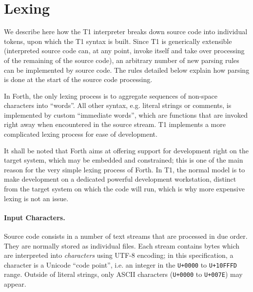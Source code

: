 \section{Lexing}\label{lexing}

We describe here how the T1 interpreter breaks down source code into
individual tokens, upon which the T1 syntax is built. Since T1 is
generically extensible (interpreted source code can, at any point,
invoke itself and take over processing of the remaining of the source
code), an arbitrary number of new parsing rules can be implemented by
source code. The rules detailed below explain how parsing is done at the
start of the source code processing.

\begin{rationale}
In Forth, the only lexing process is to aggregate sequences of non-space
characters into ``words''. All other syntax, e.g. literal strings or
comments, is implemented by custom ``immediate words'', which are
functions that are invoked right away when encountered in the source
stream. T1 implements a more complicated lexing process for ease of
development.

It shall be noted that Forth aims at offering support for development
right on the target system, which may be embedded and constrained; this
is one of the main reason for the very simple lexing process of Forth.
In T1, the normal model is to make development on a dedicated powerful
development workstation, distinct from the target system on which the
code will run, which is why more expensive lexing is not an issue.
\end{rationale}

\paragraph{Input Characters.} Source code consists in a number of text
streams that are processed in due order. They are normally stored as
individual files. Each stream contains bytes which are interpreted into
\emph{characters} using UTF-8 encoding; in this specification, a
character is a Unicode ``code point'', i.e. an integer in the
\verb|U+0000| to \verb|U+10FFFD| range. Outside of literal strings, only
ASCII characters (\verb|U+0000| to \verb|U+007E|) may appear.

